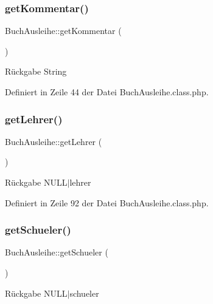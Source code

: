 \subsubsection{\texorpdfstring{get\+Kommentar()}{getKommentar()}}
{\footnotesize\ttfamily Buch\+Ausleihe\+::get\+Kommentar (\begin{DoxyParamCaption}{ }\end{DoxyParamCaption})}

\begin{DoxyReturn}{Rückgabe}
String 
\end{DoxyReturn}


Definiert in Zeile 44 der Datei Buch\+Ausleihe.\+class.\+php.

\mbox{\label{class_buch_ausleihe_af5e15787efbbfc52566757a7dbefea54}} 
\subsubsection{\texorpdfstring{get\+Lehrer()}{getLehrer()}}
{\footnotesize\ttfamily Buch\+Ausleihe\+::get\+Lehrer (\begin{DoxyParamCaption}{ }\end{DoxyParamCaption})}

\begin{DoxyReturn}{Rückgabe}
N\+U\+L\+L$\vert$lehrer 
\end{DoxyReturn}


Definiert in Zeile 92 der Datei Buch\+Ausleihe.\+class.\+php.

\mbox{\label{class_buch_ausleihe_a75db3987f92dd5e0e6dda0a5e4827dd8}} 
\subsubsection{\texorpdfstring{get\+Schueler()}{getSchueler()}}
{\footnotesize\ttfamily Buch\+Ausleihe\+::get\+Schueler (\begin{DoxyParamCaption}{ }\end{DoxyParamCaption})}

\begin{DoxyReturn}{Rückgabe}
N\+U\+L\+L$\vert$schueler 
\end{DoxyReturn}



